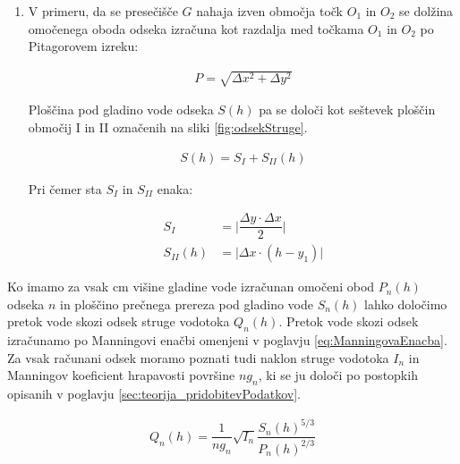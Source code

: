 \begin{enumerate}
\begin{enumerate}
	
	\item V primeru, da se presečišče $G$ nahaja izven območja točk $O_1$ in $O_2$ se dolžina omočenega oboda odseka izračuna kot razdalja med točkama $O_1$ in $O_2$ po Pitagorovem izreku:
	
	\begin{ceqn}
		\begin{align}
		P = \sqrt{ \Delta x^{2} + \Delta y^{2}}
		\end{align}
	\end{ceqn}
	
	Ploščina pod gladino vode odseka $S(h)$ pa se določi kot seštevek ploščin območij I in II označenih na sliki \ref{fig:odsekStruge}.
	
	\begin{ceqn}
		\begin{align}
		S(h) = S_I + S_{II}(h)
		\end{align}
	\end{ceqn}
	
	Pri čemer sta $S_I$ in $S_{II}$ enaka:
	
		\begin{ceqn}
			\begin{align}
			S_I&= \bigg|\dfrac{ \Delta y \cdot  \Delta x}{2}\bigg|\\
			S_{II}(h)&= \bigg|\Delta x \cdot (h - y_1)\bigg|
			\end{align}
		\end{ceqn}
		
			
		
	\end{enumerate}
	
	





\end{enumerate}



Ko imamo za vsak cm višine gladine vode izračunan omočeni obod $P_n(h)$ odseka $n$ in ploščino prečnega prereza pod gladino vode $S_n(h)$ lahko določimo pretok vode skozi odsek struge vodotoka $Q_n(h)$. Pretok vode skozi odsek izračunamo po Manningovi enačbi omenjeni v poglavju \ref{eq:ManningovaEnacba}. Za vsak računani odsek moramo poznati tudi naklon struge vodotoka $I_n$ in  Manningov koeficient hrapavosti površine $ng_n$, ki se ju določi po postopkih opisanih v poglavju \ref{sec:teorija_pridobitevPodatkov}.


\begin{ceqn}
	\begin{align}
	Q_n(h) = \dfrac{1}{ng_n} \sqrt{I_n}\dfrac{S_n(h)^{5/3}}{P_n(h)^{2/3}}
	\end{align}
\end{ceqn}


